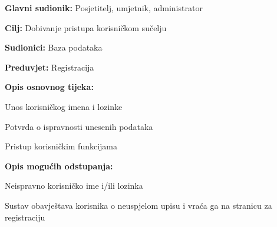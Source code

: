 					\noindent {}
					\begin{packed_item}
						
						\item \textbf{Glavni sudionik: } Posjetitelj, umjetnik, administrator
						\item  \textbf{Cilj:}  Dobivanje pristupa korisničkom sučelju
						\item  \textbf{Sudionici:}  Baza podataka
						\item  \textbf{Preduvjet:}  Registracija
						\item  \textbf{Opis osnovnog tijeka:}
						
						\item[] \begin{packed_enum}
							
							\item  Unos korisničkog imena i lozinke
							\item  Potvrda o ispravnosti unesenih podataka
							\item  Pristup korisničkim funkcijama
						\end{packed_enum}
						
						\item  \textbf{Opis mogućih odstupanja:}
						
						\item[] \begin{packed_item}
							
							\item[2.a]  Neispravno korisničko ime i/ili lozinka
							\item[] \begin{packed_enum}
								
								\item  Sustav obavještava korisnika o neuspjelom upisu i 
								vraća ga na stranicu za registraciju
								
							\end{packed_enum}							
							
						\end{packed_item}
					\end{packed_item}
					
